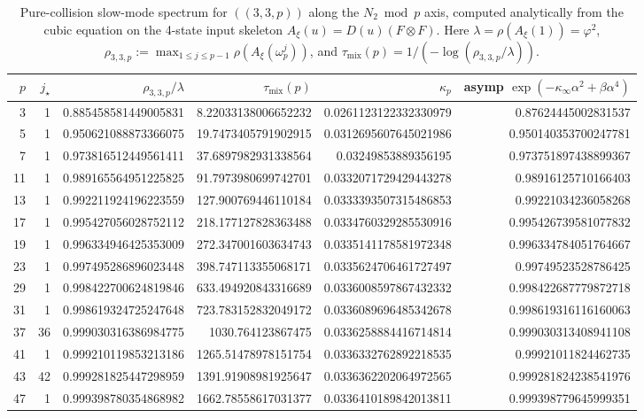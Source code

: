 \begin{table}[H]
\centering
\scriptsize
\setlength{\tabcolsep}{6pt}
\caption{Pure-collision slow-mode spectrum for $((3,3,p))$ along the $N_2\bmod p$ axis, computed analytically from the cubic equation on the 4-state input skeleton $A_\xi(u)=D(u)(F\otimes F)$. Here $\lambda=\rho(A_\xi(1))=\varphi^2$, $\rho_{3,3,p}:=\max_{1\le j\le p-1}\rho(A_\xi(\omega_p^j))$, and $\tau_{\mathrm{mix}}(p)=1/(-\log(\rho_{3,3,p}/\lambda))$.}
\label{tab:arity_pure_collision_cubic_primes}
\begin{tabular}{r r r r r r}
\toprule
$p$ & $j_\star$ & $\rho_{3,3,p}/\lambda$ & $\tau_{\mathrm{mix}}(p)$ & $\kappa_p$ & asymp $\exp(-\kappa_\infty\alpha^2+\beta\alpha^4)$\\
\midrule
3 & 1 & 0.885458581449005831 & 8.22033138006652232 & 0.0261123122332330979 & 0.87624445002831537\\
5 & 1 & 0.950621088873366075 & 19.7473405791902915 & 0.0312695607645021986 & 0.950140353700247781\\
7 & 1 & 0.973816512449561411 & 37.6897982931338564 & 0.03249853889356195 & 0.973751897438899367\\
11 & 1 & 0.989165564951225825 & 91.7973980699742701 & 0.0332071729429443278 & 0.98916125710166403\\
13 & 1 & 0.992211924196223559 & 127.900769446110184 & 0.0333393507315486853 & 0.99221034236058268\\
17 & 1 & 0.995427056028752112 & 218.177127828363488 & 0.0334760329285530916 & 0.995426739581077832\\
19 & 1 & 0.996334946425353009 & 272.347001603634743 & 0.0335141178581972348 & 0.996334784051764667\\
23 & 1 & 0.997495286896023448 & 398.747113355068171 & 0.0335624706461727497 & 0.99749523528786425\\
29 & 1 & 0.998422700624819846 & 633.494920843316689 & 0.0336008597867432332 & 0.998422687779872718\\
31 & 1 & 0.998619324725247648 & 723.783152832049172 & 0.0336089696485342678 & 0.998619316116160063\\
37 & 36 & 0.999030316386984775 & 1030.764123867475 & 0.0336258884416714814 & 0.999030313408941108\\
41 & 1 & 0.999210119853213186 & 1265.51478978151754 & 0.0336332762892218535 & 0.99921011824462735\\
43 & 42 & 0.999281825447298959 & 1391.91908981925647 & 0.0336362202064972565 & 0.999281824238541976\\
47 & 1 & 0.999398780354868982 & 1662.78558617031377 & 0.0336410189842013811 & 0.999398779645999351\\

\end{tabular}
\end{table}
